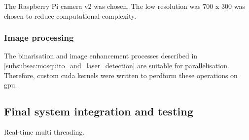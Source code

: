 The Raspberry Pi camera v2 was chosen. The low resolution was 700 x 300 was chosen to reduce computational complexity.

\subsubsection{Image processing}
The binarisation and image enhancement processes described in \autoref{subsubsec:mosquito_and_laser_detection} are suitable for parallelisation. Therefore, custom \gls{cuda} kernels were written to perdform these operations on \gls{gpu}.


\subsection{Final system integration and testing}
Real-time multi threading.

\newpage


